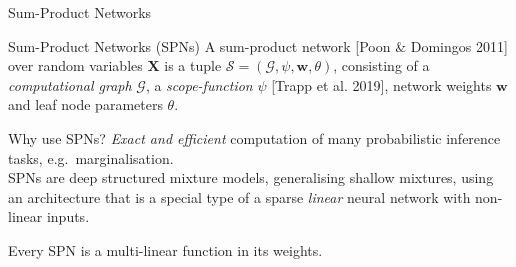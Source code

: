\documentclass{beamer}
\newcommand{\SPN}{\mathcal{S}}
\newcommand{\graph}{\mathcal{G}}
\newcommand{\scope}{\psi}
\newcommand{\X}{\bm{X}}
\begin{document}
\begin{frame}{Sum-Product Networks}
\begin{block}{Sum-Product Networks (SPNs)}
    A sum-product network [Poon \& Domingos 2011] over random variables $\X$ is a tuple $\SPN = (\graph, \scope, \bm{w}, \theta)$, consisting of a \emph{computational graph} $\graph$, a \emph{scope-function} $\scope$ [Trapp et al. 2019], network weights $\bm{w}$ and leaf node parameters $\theta$.
\end{block}
Why use SPNs? \emph{Exact and efficient} computation of many probabilistic inference tasks, e.g.~marginalisation.
\\[2em]

SPNs are deep structured mixture models, generalising shallow mixtures, using an architecture that is a special type of a sparse \emph{linear} neural network with non-linear inputs.

Every SPN is a multi-linear function in its weights.
\end{frame}
\end{document}
